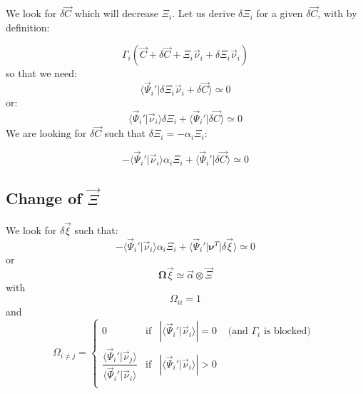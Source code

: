 \documentclass[aps,12pt]{revtex4}
\begin{document}
We look for $\delta\vec{C}$ which will decrease $\Xi_i$. Let us
derive $\delta\Xi_i$ for a given $\delta\vec{C}$, with by definition:

\begin{equation}
	\Gamma_i\left( \vec{C} + \delta\vec{C} + \Xi_i \vec{\nu}_i + \delta \Xi_i \vec{\nu}_i \right)
\end{equation}
so that we need:
\begin{equation}
	\langle \vec{\Psi}_i' \vert  \delta \Xi_i \vec{\nu}_i + \delta\vec{C} \rangle \simeq 0
\end{equation}
or:
\begin{equation}
	\langle \vec{\Psi}_i' \vert  \vec{\nu}_i  \rangle  \delta \Xi_i + \langle \vec{\Psi}_i' \vert \delta\vec{C} \rangle \simeq 0
 \end{equation}
We are looking for $\delta\vec{C}$ such that $\delta\Xi_i = -\alpha_i \Xi_i$:

\begin{equation}
		- \langle \vec{\Psi}_i' \vert  \vec{\nu}_i  \rangle  \alpha_i \Xi_i + \langle \vec{\Psi}_i' \vert \delta\vec{C} \rangle \simeq 0
\end{equation}
 
\subsection{Change of $\vec{\Xi}$}

We look for $\delta\vec{\xi}$ such that:
\begin{equation}
		- \langle \vec{\Psi}_i' \vert  \vec{\nu}_i  \rangle  \alpha_i \Xi_i + \langle \vec{\Psi}_i' \vert \bm{\nu}^T \vert \delta\vec{\xi} \rangle \simeq 0
\end{equation}
or
\begin{equation}
	\bm{\Omega} \vec{\xi} \simeq \vec{\alpha} \otimes \vec{\Xi}
\end{equation}
with
\begin{equation}
	\Omega_{ii} = 1
\end{equation}
and
\begin{equation}
\Omega_{i\not=j} = 
\left\lbrace
	\begin{array}{ccll}
	0 & \text{if} & |\langle \vec{\Psi}_i'  \vert \vec{\nu}_i \rangle| = 0 & \text{ (and $\Gamma_i$ is blocked) }\\
	\dfrac{\langle \vec{\Psi}_i'  \vert \vec{\nu}_j \rangle}{\langle \vec{\Psi}_i'  \vert \vec{\nu}_i \rangle}
	 & \text{if} & |\langle \vec{\Psi}_i'  \vert \vec{\nu}_i \rangle| > 0
	 & \\
	\end{array}
\right.
\end{equation}
\end{document}
